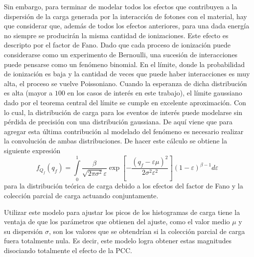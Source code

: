 Sin embargo, para terminar de modelar todos los efectos que contribuyen a la dispersión de la carga generada por la interacción de fotones con el material, hay que considerar que, además de todos los efectos anteriores, para una dada energía no siempre se producirán la misma cantidad de ionizaciones. Este efecto es descripto por el factor de Fano. Dado que cada proceso de ionización puede considerarse como un experimento de Bernoulli, una sucesión de interacciones puede pensarse como un fenómeno binomial. En el límite, donde la probabilidad de ionización es baja y la cantidad de veces que puede haber interacciones es muy alta, el proceso se vuelve Poissoniano. Cuando la esperanza de dicha distribución es alta (mayor a $100$ en los casos de interés en este trabajo), el límite gaussiano dado por el teorema central del límite se cumple en excelente aproximación. Con lo cual, la distribución de carga para los eventos de interés puede modelarse sin pérdida de precisión con una distribución gaussiana. De aquí viene que para agregar esta última contribución al modelado del fenómeno es necesario realizar la convolución de ambas distribuciones. De hacer este cálculo se obtiene la siguiente expresión
\begin{equation*}
    f_{Q_{f}}(q_{f}) = 
    \int\limits_{0}^{1}
    \frac{\beta}{\sqrt{2\pi \sigma^{2}}\varepsilon}
    \exp[%
    -\frac{(q_{f}-\varepsilon\mu)^{2}}{2\sigma^{2}\varepsilon^{2}}
    ](1-\varepsilon)^{\beta - 1}
    d\varepsilon
\end{equation*}
para la distribución teórica de carga debido a los efectos del factor de Fano y la colección parcial de carga actuando conjuntamente.

Utilizar este modelo para ajustar los picos de los histogramas de carga tiene la ventaja de que los parámetros que obtienen del ajuste, como el valor medio $\mu$ y su dispersión $\sigma$, son los valores que se obtendrían si la colección parcial de carga fuera totalmente nula. Es decir, este modelo logra obtener estas magnitudes disociando totalmente el efecto de la PCC. 


